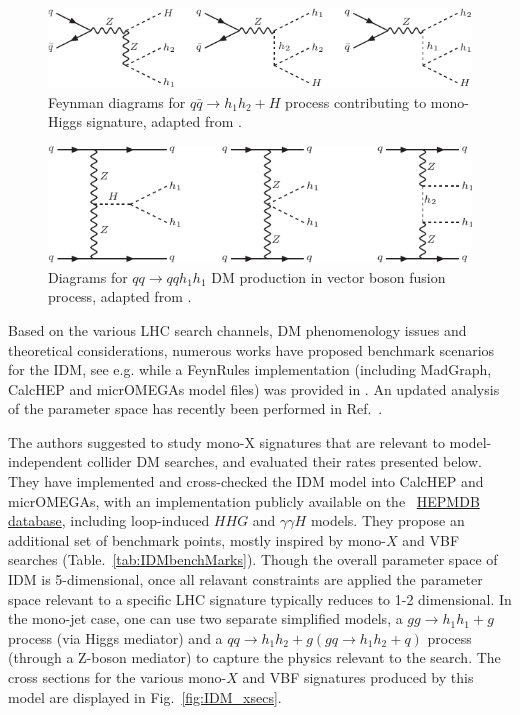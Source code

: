 \begin{figure}[htb]
\includegraphics[width=\textwidth]{figures/EW/i2HDM/fd-mono-h2.pdf} 
\caption{Feynman diagrams for $q\bar{q}\to h_1 h_2+H$  process 
contributing to mono-Higgs signature, adapted from \cite{Belyaev:2015tap}.}
\label{fig:fdmonoH2}
\end{figure}
\begin{figure}[htb]
\includegraphics[width=\textwidth]{figures/EW/i2HDM/fd-vbf.pdf} 
\caption{Diagrams for $qq\to qq h_1 h_1$ DM production in vector boson
fusion process, adapted from \cite{Belyaev:2015tap}.}
\label{fig:fdvbf}
\end{figure}

Based on the various LHC search channels, DM phenomenology issues and theoretical considerations, numerous works have proposed benchmark scenarios for the IDM, see e.g. \cite{IDMmultileptons,Goudelis:2013uca} while a FeynRules implementation (including MadGraph, CalcHEP and micrOMEGAs model files) was provided in \cite{IDMmultileptons}. An updated analysis of the parameter space has recently been performed in Ref.~\cite{Belyaev:2015tap}. 

The authors suggested to study mono-X  signatures that are relevant to model-independent collider DM searches,
and evaluated their rates presented below. They have implemented and cross-checked the IDM model into CalcHEP and micrOMEGAs,
with an implementation publicly available on the  ~\href{http://hepmdb.soton.ac.uk/hepmdb:0615.0189}{HEPMDB database}, including loop-induced $HHG$ and $\gamma\gamma H$ models. They propose an additional set of benchmark points, mostly inspired by mono-$X$ and VBF searches (Table.~\ref{tab:IDMbenchMarks}). Though the overall parameter space of IDM is 5-dimensional, once all relavant constraints are applied the parameter space relevant to a specific LHC signature typically reduces to 1-2 dimensional. In the mono-jet case, one can use two separate simplified models, a $gg \rightarrow h_1 h_1 + g$ process (via Higgs mediator) and a $qq \rightarrow h_1 h_2 + g (gq \rightarrow h_1 h_2 + q)$ process (through a Z-boson mediator) to capture the physics relevant to the search.
The cross sections for the various mono-$X$ and VBF signatures produced by this model are displayed in Fig.~\ref{fig:IDM_xsecs}.



